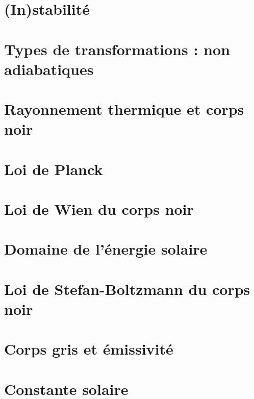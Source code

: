 \documentclass[a4paper,DIV16,10pt]{scrartcl}
\begin{document}
\newpage
\section{(In)stabilité}


\newpage
\section{Types de transformations : non adiabatiques}


\newpage
\section{Rayonnement thermique et corps noir}



\newpage
\section{Loi de Planck}


\newpage
\section{Loi de Wien du corps noir}


\newpage
\section{Domaine de l'énergie solaire}


\newpage
\section{Loi de Stefan-Boltzmann du corps noir}


\newpage
\section{Corps gris et émissivité}


\newpage
\section{Constante solaire}


\end{document}
